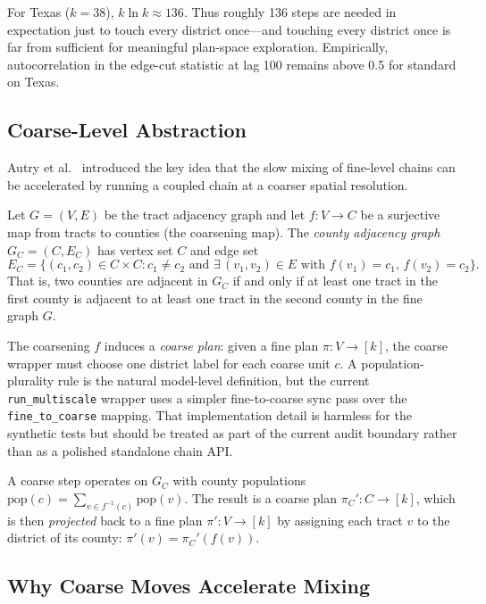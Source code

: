 For Texas ($k = 38$), $k \ln k \approx 136$.
Thus roughly 136 steps are needed in expectation just to touch every district
once---and touching every district once is far from sufficient for meaningful
plan-space exploration.
Empirically, autocorrelation in the edge-cut statistic at lag 100 remains
above 0.5 for standard \recom{} on Texas.

\subsection{Coarse-Level Abstraction}

Autry et al.~\citep{autry2021} introduced the key idea that the slow mixing
of fine-level chains can be accelerated by running a coupled chain at a
coarser spatial resolution.

\begin{definition}[Coarsening]
\label{def:coarsening}
Let $G = (V, E)$ be the tract adjacency graph and let $f : V \to C$ be a
surjective map from tracts to counties (the coarsening map).
The \emph{county adjacency graph} $G_C = (C, E_C)$ has vertex set $C$
and edge set
\[
  E_C = \{(c_1, c_2) \in C \times C : c_1 \neq c_2
            \text{ and } \exists\, (v_1, v_2) \in E
            \text{ with } f(v_1) = c_1,\, f(v_2) = c_2\}.
\]
That is, two counties are adjacent in $G_C$ if and only if at least one
tract in the first county is adjacent to at least one tract in the second
county in the fine graph $G$.
\end{definition}

The coarsening $f$ induces a \emph{coarse plan}: given a fine plan
$\pi : V \to [k]$, the coarse wrapper must choose one district label for each
coarse unit $c$.  A population-plurality rule is the natural model-level
definition, but the current \texttt{run\_multiscale} wrapper uses a simpler
fine-to-coarse sync pass over the \texttt{fine\_to\_coarse} mapping.  That
implementation detail is harmless for the synthetic tests but should be
treated as part of the current audit boundary rather than as a polished
standalone chain API.

A coarse \recom{} step operates on $G_C$ with county populations
$\mathrm{pop}(c) = \sum_{v \in f^{-1}(c)} \mathrm{pop}(v)$.
The result is a coarse plan $\pi_C' : C \to [k]$, which is then
\emph{projected} back to a fine plan $\pi' : V \to [k]$ by assigning each
tract $v$ to the district of its county: $\pi'(v) = \pi_C'(f(v))$.

\subsection{Why Coarse Moves Accelerate Mixing}

